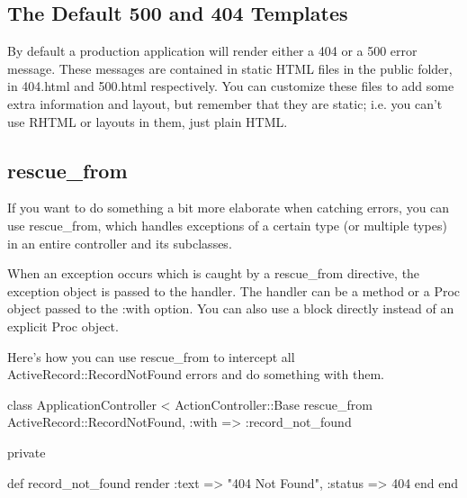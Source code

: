 \documentclass[10pt]{book}
\newenvironment{code}{%
  \scriptsize
    \verbatim
}{%
    \endverbatim
    \newline
}
\begin{document}
\subsection{ The Default 500 and 404 Templates}

By default a production application will render either a 404 or a 500 error message. These messages are contained in static HTML files in the public folder, in 404.html and 500.html  respectively. You can customize these files to add some extra  information and layout, but remember that they are static; i.e. you  can’t use RHTML or layouts in them, just plain HTML.

\subsection{ rescue\_from}

If you want to do something a bit more elaborate when catching errors, you can use rescue\_from, which handles exceptions of a certain type (or multiple types) in an entire controller and its subclasses.

When an exception occurs which is caught by a rescue\_from directive, the exception object is passed to the handler. The handler can be a method or a Proc object passed to the :with option. You can also use a block directly instead of an explicit Proc object.

Here’s how you can use rescue\_from to intercept all ActiveRecord::RecordNotFound errors and do something with them.
\begin{code}
class ApplicationController < ActionController::Base
  rescue_from ActiveRecord::RecordNotFound, :with => :record_not_found
 
  private
 
  def record_not_found
    render :text => "404 Not Found", :status => 404
  end
end
\end{code}
\end{document}
